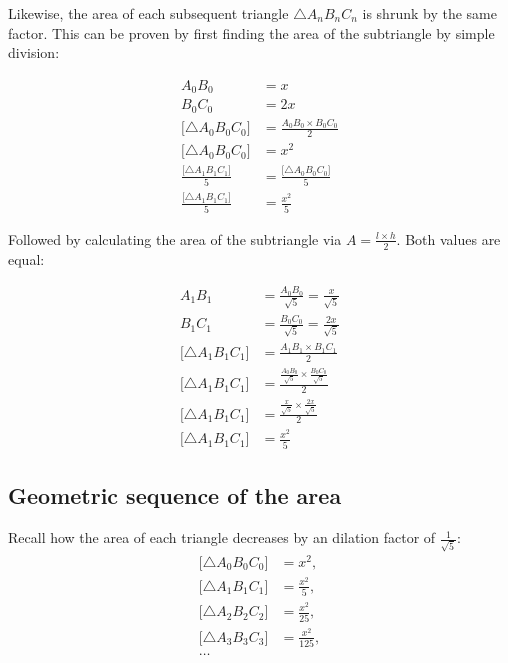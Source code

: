 \noindent
Likewise, the area of each subsequent triangle $\triangle A_{n}B_{n}C_{n}$ is shrunk by the same factor. This can be proven by first finding the area of the subtriangle by simple division:

\begin{equation}
    \begin{aligned}
        A_{0}B_{0} &= x \\
        B_{0}C_{0} &= 2x \\
        \big[\triangle A_{0}B_{0}C_{0}\big] &= \frac{A_{0}B_{0} \times B_{0}C_{0}}{2} \\
        \big[\triangle A_{0}B_{0}C_{0}\big] &= x^2 \\
        \frac{\big[\triangle A_{1}B_{1}C_{1}\big]}{5} &= \frac{\big[\triangle A_{0}B_{0}C_{0}\big]}{5} \\
        \frac{\big[\triangle A_{1}B_{1}C_{1}\big]}{5} &= \frac{x^2}{5}
    \end{aligned}
\end{equation}

\noindent
Followed by calculating the area of the subtriangle via $A = \frac{l\times h}{2}$. Both values are equal:

\begin{equation}
    \begin{aligned}
        A_{1}B_{1} &= \frac{A_{0}B_{0}}{\sqrt{5}} = \frac{x}{\sqrt{5}}\\
        B_{1}C_{1} &= \frac{B_{0}C_{0}}{\sqrt{5}} = \frac{2x}{\sqrt{5}}\\
        \big[\triangle A_{1}B_{1}C_{1}\big] &= \frac{A_{1}B_{1} \times B_{1}C_{1}}{2} \\
        \big[\triangle A_{1}B_{1}C_{1}\big] &=  \frac{\frac{A_{0}B_{0}}{\sqrt{5}} \times \frac{B_{0}C_{0}}{\sqrt{5}}}{2} \\
        \big[\triangle A_{1}B_{1}C_{1}\big] &=  \frac{\frac{x}{\sqrt{5}} \times \frac{2x}{\sqrt{5}}}{2} \\
        \big[\triangle A_{1}B_{1}C_{1}\big] &=  \frac{x^2}{5}
    \end{aligned}
\end{equation}

\subsection{Geometric sequence of the area}
Recall how the area of each triangle decreases by an dilation factor of $\frac{1}{\sqrt{5}}$:
\begin{equation}
    \begin{aligned}
        \big[\triangle A_{0}B_{0}C_{0}\big] &= x^2,\\
        \big[\triangle A_{1}B_{1}C_{1}\big] &= \frac{x^2}{5},\\
        \big[\triangle A_{2}B_{2}C_{2}\big] &= \frac{x^2}{25},\\
        \big[\triangle A_{3}B_{3}C_{3}\big] &= \frac{x^2}{125},\\
        \ldots
    \end{aligned}
\end{equation}

